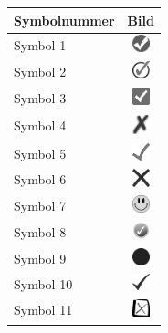 \documentclass[a4paper,notitlepage,parskip]{scrartcl}
\begin{document}
\begin{table}[H]
\begin{center}
\begin{tabular}{|l|c|}
\hline
Symbolnummer & Bild \\
\hline
Symbol 1& \includegraphics[width=5mm]{img01.png} \\
Symbol 2& \includegraphics[width=5mm]{img02.png} \\
Symbol 3& \includegraphics[width=5mm]{img03.png} \\
Symbol 4& \includegraphics[width=5mm]{img04.png} \\
Symbol 5& \includegraphics[width=5mm]{img05.png} \\
Symbol 6& \includegraphics[width=5mm]{img06.png} \\
Symbol 7& \includegraphics[width=5mm]{img07.png} \\
Symbol 8& \includegraphics[width=5mm]{img08.png} \\
Symbol 9& \includegraphics[width=5mm]{img09.png} \\
Symbol 10& \includegraphics[width=5mm]{img10.png} \\
Symbol 11& \includegraphics[width=5mm]{img11.png} \\

\end{tabular}
\end{center}
\end{table}
\end{document}
